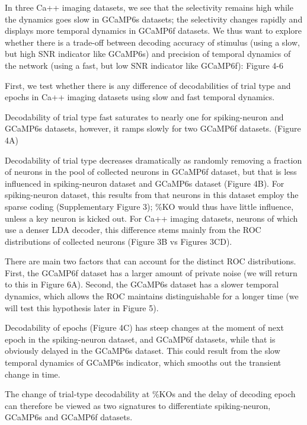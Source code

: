 \documentclass[12pt, oneside]{nature}
\begin{document}
\noindent In three Ca++ imaging datasets, we see that the selectivity
remains high while the dynamics goes slow in GCaMP6s datasets; 
the selectivity changes rapidly and displays more temporal dynamics
in GCaMP6f datasets. We thus want to explore whether there is a trade-off 
between decoding accuracy of stimulus (using a slow, but high
SNR indicator like GCaMP6s)
and precision of temporal dynamics of the network (using a fast, but low
SNR indicator like GCaMP6f): Figure 4-6

\noindent First, we test whether there is any difference of decodabilities of trial
type and epochs in Ca++ imaging datasets using slow and fast temporal dynamics.

\noindent Decodability of trial type fast saturates to nearly one for spiking-neuron and 
GCaMP6s datasets, however, it ramps slowly for two GCaMP6f datasets. (Figure 4A)

\noindent Decodability of trial type decreases dramatically as randomly removing a fraction of neurons 
in the pool of collected neurons in GCaMP6f dataset, but that is less influenced in
spiking-neuron dataset and GCaMP6s dataset (Figure 4B). For spiking-neuron dataset,
this results from that neurons in this dataset employ the sparse coding (Supplementary
Figure 3); \%KO would thus have little influence, unless a key neuron is kicked out.
For Ca++ imaging datasets, neurons of which use a denser LDA decoder, this difference
stems mainly from the ROC distributions of collected neurons (Figure 3B vs Figures 3CD).

\noindent There are main two factors that can account for the distinct ROC distributions. First,
the GCaMP6f dataset has a larger amount of private noise (we will return to this in Figure 6A).
Second, the GCaMP6s dataset has a slower temporal dynamics, which allows the ROC maintains
distinguishable for a longer time (we will test this hypothesis later in Figure 5).

\noindent Decodability of epochs (Figure 4C) has steep changes at the moment of next 
epoch in the spiking-neuron dataset, and GCaMP6f datasets, while that is 
obviously delayed in the GCaMP6s dataset. This could result from the slow 
temporal dynamics of GCaMP6s indicator, which smooths out the transient
change in time.

\noindent The change of trial-type decodability at \%KOs and the delay of 
decoding epoch can therefore be viewed as two signatures to differentiate 
spiking-neuron, GCaMP6s and GCaMP6f datasets.
\end{document}
